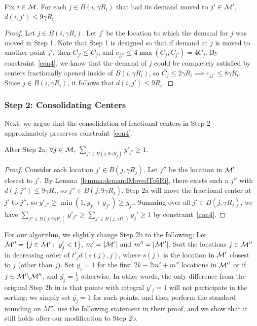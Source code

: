 \begin{lemma}
\label{lemma:demandMovedTo5Ri}
    Fix $i \in \mathcal{M}$. For each $j \in B(i, \gamma R_i)$ that had its demand moved to $j' \in \mathcal{M}'$, $d(i, j') \leq 9 \gamma R_i$.
\end{lemma}
\begin{proof}
    Let $j \in B(i, \gamma R_i)$. Let $j'$ be the location to which the demand for $j$ was moved in Step 1. Note that Step 1 is designed so that if demand at $j$ is moved to another point $j'$, then $\bar{C_{j'}} \leq \bar{C_j}$, and $c_{jj'} \leq 4\max(\bar{C_j},\bar{C_{j'}}) = 4 \bar{C_j}$. By constraint~\ref{con4}, we know that the demand of $j$ could be completely satisfied by centers fractionally opened inside of $B(i, \gamma R_i)$, so $\bar{C_j} \leq 2 \gamma R_i \implies c_{jj'} \leq 8 \gamma R_i$. Since $j \in B(i, \gamma R_i)$, it follows that $d(i, j') \leq 9 R_i$.
\end{proof}

\subsubsection{Step 2: Consolidating Centers}
Next, we argue that the consolidation of fractional centers in Step 2 approximately preserves constraint~\ref{con4}.

\begin{lemma}
\label{lemma:centerIn5Ri}
    After Step 2a, $\forall j \in \mathcal{M}$, $\sum_{j' \in B(j, 9 \gamma R_j)} y'_{j'} \geq 1$.
\end{lemma}
\begin{proof}
    Consider each location $j' \in B(j, \gamma R_j)$. Let $j''$ be the location in $\mathcal{M}'$ closest to $j'$. By Lemma~\ref{lemma:demandMovedTo5Ri}, there exists such a $j''$ with $d(j, j'') \leq 9 \gamma R_j$, so $j'' \in B(j, 9 \gamma R_j)$. Step 2a will move the fractional center at $j'$ to $j''$, so $y'_{j''} \geq \min(1, y_{j'} + y_{j''}) \geq y_{j'}$. Summing over all $j' \in B(j, \gamma R_j)$, we have $\sum_{j'' \in B(j, 9 \gamma R_j)} y'_{j''} \geq \sum_{j' \in B(j, \gamma R_j)} y_j' \geq 1$ by constraint~\ref{con4}.
\end{proof}

For our algorithm, we slightly change Step 2b to the following: Let $\mathcal{M}'' = \lbrace j\in \mathcal{M}': \; y'_j < 1 \rbrace$, $m'=|\mathcal{M}'|$ and $m''=|\mathcal{M}''|$. Sort the locations $j \in \mathcal{M}''$ in decreasing order of $t'_j d(s(j), j)$, where $s(j)$ is the location in $\mathcal{M}'$ closest to $j$ (other than $j$). Set $\bar{y_j} = 1$ for the first $2k - 2m' + m''$ locations in $\mathcal{M}''$ or if $j \in \mathcal{M}'\backslash \mathcal{M}''$, and $\bar{y_j} = \frac{1}{2}$ otherwise. In other words, the only difference from the original Step 2b in \cite{kMedianLP} is that points with integral $y'_j = 1$ will not participate in the sorting; we simply set $\bar{y_j} = 1$ for such points, and then perform the standard rounding on $M''$. \cite{kMedianLP} use the following statement in their proof, and we show that it still holds after our modification to Step 2b.

